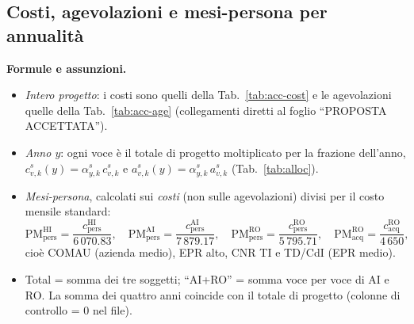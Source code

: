 \documentclass{plan4ari_report}
\begin{document}
\subsection{Costi, agevolazioni e mesi-persona per annualit\`a}
\textbf{Formule e assunzioni.}
\begin{itemize}
  \item \emph{Intero progetto}: i costi sono quelli della Tab.~\ref{tab:acc-cost} e le agevolazioni quelle della Tab.~\ref{tab:acc-age} (collegamenti diretti al foglio ``PROPOSTA ACCETTATA'').
  \item \emph{Anno $y$}: ogni voce \`e il totale di progetto moltiplicato per la frazione dell'anno, $c^{s}_{v,k}(y) = \alpha^{s}_{y,k}\, c^{s}_{v,k}$ e $a^{s}_{v,k}(y) = \alpha^{s}_{y,k}\, a^{s}_{v,k}$ (Tab.~\ref{tab:alloc}).
  \item \emph{Mesi-persona}, calcolati sui \emph{costi} (non sulle agevolazioni) divisi per il costo mensile standard:
  \[
  \mathrm{PM}^{\mathrm{HI}}_{\mathrm{pers}} = \frac{c^{\mathrm{HI}}_{\mathrm{pers}}}{6\,070.83},\quad
  \mathrm{PM}^{\mathrm{AI}}_{\mathrm{pers}} = \frac{c^{\mathrm{AI}}_{\mathrm{pers}}}{7\,879.17},\quad
  \mathrm{PM}^{\mathrm{RO}}_{\mathrm{pers}} = \frac{c^{\mathrm{RO}}_{\mathrm{pers}}}{5\,795.71},\quad
  \mathrm{PM}^{\mathrm{RO}}_{\mathrm{acq}} = \frac{c^{\mathrm{RO}}_{\mathrm{acq}}}{4\,650},
  \]
  cio\`e COMAU (azienda medio), EPR alto, CNR TI e TD/CdI (EPR medio).
  \item Total = somma dei tre soggetti; ``AI+RO'' = somma voce per voce di AI e RO. La somma dei quattro anni coincide con il totale di progetto (colonne di controllo = 0 nel file).
\end{itemize}
\end{document}
